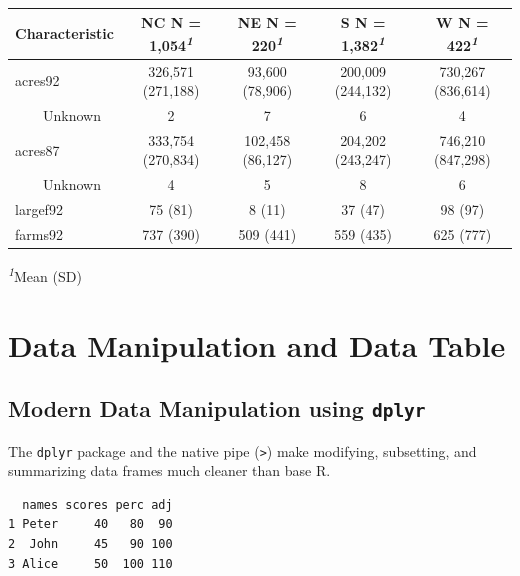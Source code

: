 \documentclass[
  letterpaper,
  DIV=11,
  numbers=noendperiod]{scrreprt}
\renewcommand{\[}{\begin{equation}}
\renewcommand{\]}{\end{equation}}
\begin{document}
\begin{table}
\fontsize{12.0pt}{14.0pt}\selectfont
\begin{tabular*}{\linewidth}{@{\extracolsep{\fill}}lcccc}
\toprule
\textbf{Characteristic} & \textbf{NC}  N = 1,054\textsuperscript{\textit{1}} & \textbf{NE}  N = 220\textsuperscript{\textit{1}} & \textbf{S}  N = 1,382\textsuperscript{\textit{1}} & \textbf{W}  N = 422\textsuperscript{\textit{1}} \\ 
\midrule\addlinespace[2.5pt]
acres92 & 326,571 (271,188) & 93,600 (78,906) & 200,009 (244,132) & 730,267 (836,614) \\ 
    Unknown & 2 & 7 & 6 & 4 \\ 
acres87 & 333,754 (270,834) & 102,458 (86,127) & 204,202 (243,247) & 746,210 (847,298) \\ 
    Unknown & 4 & 5 & 8 & 6 \\ 
largef92 & 75 (81) & 8 (11) & 37 (47) & 98 (97) \\ 
farms92 & 737 (390) & 509 (441) & 559 (435) & 625 (777) \\ 
\bottomrule
\end{tabular*}
\begin{minipage}{\linewidth}
\vspace{.05em}
\textsuperscript{\textit{1}}Mean (SD)\\
\end{minipage}
\end{table}

\section{Data Manipulation and Data
Table}\label{data-manipulation-and-data-table}

\subsection{\texorpdfstring{Modern Data Manipulation using
\texttt{dplyr}}{Modern Data Manipulation using dplyr}}\label{modern-data-manipulation-using-dplyr}

The \texttt{dplyr} package and the native pipe
(\texttt{\textbar{}\textgreater{}}) make modifying, subsetting, and
summarizing data frames much cleaner than base R.

\begin{verbatim}
  names scores perc adj
1 Peter     40   80  90
2  John     45   90 100
3 Alice     50  100 110
\end{verbatim}
\end{document}
